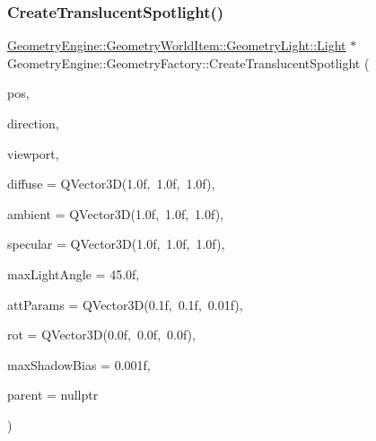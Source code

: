 \subsubsection{\texorpdfstring{CreateTranslucentSpotlight()}{CreateTranslucentSpotlight()}\hspace{0.1cm}{\footnotesize\ttfamily [1/2]}}
{\footnotesize\ttfamily \mbox{\hyperlink{class_geometry_engine_1_1_geometry_world_item_1_1_geometry_light_1_1_light}{Geometry\+Engine\+::\+Geometry\+World\+Item\+::\+Geometry\+Light\+::\+Light}} $\ast$ Geometry\+Engine\+::\+Geometry\+Factory\+::\+Create\+Translucent\+Spotlight (\begin{DoxyParamCaption}\item[{const Q\+Vector3D \&}]{pos,  }\item[{const Q\+Vector3D \&}]{direction,  }\item[{const \mbox{\hyperlink{class_geometry_engine_1_1_geometry_item_utils_1_1_viewport}{Geometry\+Item\+Utils\+::\+Viewport}} \&}]{viewport,  }\item[{const Q\+Vector3D \&}]{diffuse = {\ttfamily QVector3D(1.0f,~1.0f,~1.0f)},  }\item[{const Q\+Vector3D \&}]{ambient = {\ttfamily QVector3D(1.0f,~1.0f,~1.0f)},  }\item[{const Q\+Vector3D \&}]{specular = {\ttfamily QVector3D(1.0f,~1.0f,~1.0f)},  }\item[{float}]{max\+Light\+Angle = {\ttfamily 45.0f},  }\item[{const Q\+Vector3D \&}]{att\+Params = {\ttfamily QVector3D(0.1f,~0.1f,~0.01f)},  }\item[{const Q\+Vector3D \&}]{rot = {\ttfamily QVector3D(0.0f,~0.0f,~0.0f)},  }\item[{float}]{max\+Shadow\+Bias = {\ttfamily 0.001f},  }\item[{\mbox{\hyperlink{class_geometry_engine_1_1_geometry_world_item_1_1_world_item}{Geometry\+World\+Item\+::\+World\+Item}} $\ast$}]{parent = {\ttfamily nullptr} }\end{DoxyParamCaption})\hspace{0.3cm}{\ttfamily [static]}}

